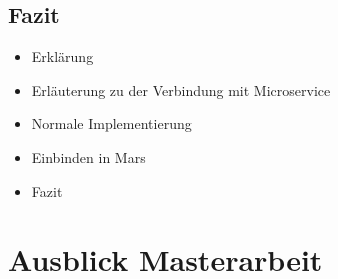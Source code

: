 \documentclass{llncs}
\begin{document}
\subsection{Fazit}
\begin{itemize}
\item Erklärung
\item Erläuterung zu der Verbindung mit Microservice
\item Normale Implementierung
\item Einbinden in Mars
\item Fazit
\end{itemize}
\section{Ausblick Masterarbeit}



\end{document}
